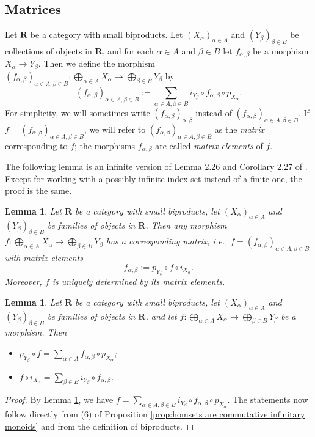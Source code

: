 \documentclass[12pt]{tac}
\newtheorem{lemma}[theorem]{Lemma}
\theoremstyle{definition}
\theoremstyle{remark}
\newcommand{\<}{\langle}
\renewcommand{\>}{\rangle}
\renewcommand{\:}{\colon}
\begin{document}
\subsection{Matrices}

    Let $\mathbf R$ be a category with small biproducts. Let $(X_\alpha)_{\alpha\in A}$ and $(Y_\beta)_{\beta\in B}$ be collections of objects in $\mathbf R$, and for each $\alpha\in A$ and $\beta\in B$ let $f_{\alpha,\beta}$ be a morphism $X_\alpha\to Y_\beta$. Then we define the morphism  $(f_{\alpha,\beta})_{\alpha\in A,\beta\in B}:\bigoplus_{\alpha \in A}X_\alpha\to\bigoplus_{\beta\in B}Y_\beta$ by 
    \[ (f_{\alpha,\beta})_{\alpha\in A,\beta\in B}:=\sum_{\alpha\in A,\beta\in B}i_{Y_\beta}\circ f_{\alpha,\beta}\circ p_{X_\alpha}.\]
     For simplicity, we will sometimes write $(f_{\alpha,\beta})_{\alpha,\beta}$ instead of $(f_{\alpha,\beta})_{\alpha\in A,\beta\in B}$.
If $f=(f_{\alpha,\beta})_{\alpha\in A,\beta\in B}$, we will refer to $(f_{\alpha,\beta})_{\alpha\in A,\beta\in B}$ as the \emph{matrix} corresponding to $f$; the morphisms $f_{\alpha,\beta}$ are called \emph{matrix elements} of $f$.


The following lemma is an infinite version of Lemma 2.26 and Corollary 2.27 of \cite{heunenvicary}. Except for working with a possibly infinite index-set instead of a finite one, the proof is the same.
\begin{lemma}\label{lem:matrix elements}
Let $\mathbf R$ be a category with small biproducts, let $(X_\alpha)_{\alpha\in A}$ and $(Y_\beta)_{\beta\in B}$ be families of objects in $\mathbf R$. Then any morphism $f:\bigoplus_{\alpha\in A}X_\alpha\to \bigoplus_{\beta\in B}Y_\beta$ has a corresponding matrix, i.e., $f=(f_{\alpha,\beta})_{\alpha\in A,\beta\in B}$ with matrix elements \[f_{\alpha,\beta}:=p_{Y_\beta}\circ f\circ i_{X_\alpha}.\] Moreover, $f$ is uniquely determined by its matrix elements.
\end{lemma}


\begin{lemma}\label{lem:matrices,projections,injections}
    Let $\mathbf R$ be a category with small biproducts, let $(X_\alpha)_{\alpha\in A}$ and $(Y_\beta)_{\beta\in B}$ be families of objects in $\mathbf R$, and let $f:\bigoplus_{\alpha\in A}X_\alpha\to \bigoplus_{\beta\in B}Y_\beta$ be a morphism. Then
    \begin{itemize}
        \item[(a)] $p_{Y_\beta}\circ f=\sum_{\alpha\in A}f_{\alpha,\beta}\circ p_{X_\alpha}$;
        \item[(b)] $f\circ i_{X_\alpha}=\sum_{\beta\in B}i_{Y_\beta}\circ f_{\alpha,\beta}$.
    \end{itemize}
\end{lemma}
\begin{proof}
   By Lemma \ref{lem:matrix elements}, we have $f=\sum_{\alpha\in A,\beta\in B}i_{Y_\beta}\circ f_{\alpha,\beta}\circ p_{X_\alpha}$. The statements now follow directly from (6) of Proposition \ref{prop:homsets are commutative infinitary monoids} and from the definition of biproducts.
\end{proof}
\end{document}
